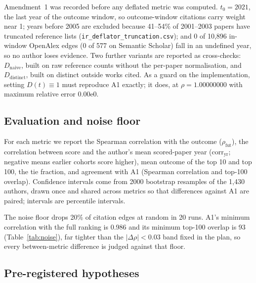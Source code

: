 \documentclass{article}
\begin{document}
Amendment~1 was recorded before any deflated metric was computed. $t_0 = 2021$, the last year of
the outcome window, so outcome-window citations carry weight near 1; years before 2005 are
excluded because 41--54\% of 2001--2003 papers have truncated reference lists
(\texttt{ir\_deflator\_truncation.csv}); and 0 of 10,896 in-window OpenAlex edges (0 of 577 on
Semantic Scholar) fall in an undefined year, so no author loses evidence. Two further variants
are reported as cross-checks: $D_{\text{naive}}$, built on raw reference counts without the
per-paper normalisation, and $D_{\text{distinct}}$, built on distinct outside works cited. As a
guard on the implementation, setting $D(t) \equiv 1$ must reproduce A1 exactly; it does, at
$\rho = 1.00000000$ with maximum relative error $0.00\text{e}0$.

\subsection{Evaluation and noise floor}

For each metric we report the Spearman correlation with the outcome ($\rho_{\text{fut}}$), the
correlation between score and the author's mean scored-paper year ($\text{corr}_{\text{yr}}$;
negative means earlier cohorts score higher), mean outcome of the top 10 and top 100, the tie
fraction, and agreement with A1 (Spearman correlation and top-100 overlap). Confidence intervals
come from 2000 bootstrap resamples of the 1,430 authors, drawn once and shared across metrics so
that differences against A1 are paired; intervals are percentile intervals.

The noise floor drops 20\% of citation edges at random in 20 runs. A1's minimum correlation with
the full ranking is 0.986 and its minimum top-100 overlap is 93 (Table~\ref{tab:noise}), far
tighter than the $|\Delta\rho| < 0.03$ band fixed in the plan, so every between-metric difference
is judged against that floor.

\subsection{Pre-registered hypotheses}
\end{document}
